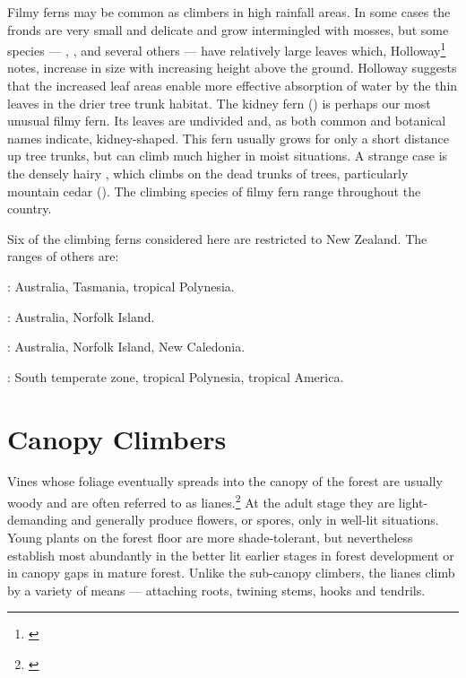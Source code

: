 Filmy ferns may be common as climbers in high rainfall areas.
In some cases the fronds are very small and delicate and grow intermingled with mosses, but some species — , ,  and several others — have relatively large leaves which, Holloway\footnote{\cite{holloway1923studies}} notes, increase in size with increasing height above the ground.
Holloway suggests that the increased leaf areas enable more effective absorption of water by the thin leaves in the drier tree trunk habitat.
The kidney fern () is perhaps our most unusual filmy fern.
Its leaves are undivided and, as both common and botanical names indicate, kidney-shaped.
This fern usually grows for only a short distance up tree trunks, but can climb much higher in moist situations.
A strange case is the densely hairy , which climbs on the dead trunks of trees, particularly mountain cedar ().
The climbing species of filmy fern range throughout the country.

Six of the climbing ferns considered here are restricted to New Zealand.
The ranges of others are:

: Australia, Tasmania, tropical Polynesia.

: Australia, Norfolk Island.

: Australia, Norfolk Island, New Caledonia.

: South temperate zone, tropical Polynesia, tropical America.

\section{Canopy Climbers}

Vines whose foliage eventually spreads into the canopy of the forest are usually woody and are often referred to as lianes.\footnote{\cite{bird1916observations}}
At the adult stage they are light-demanding and generally produce flowers, or spores, only in well-lit situations.
Young plants on the forest floor are more shade-tolerant, but nevertheless establish most abundantly in the better lit earlier stages in forest development or in canopy gaps in mature forest.
Unlike the sub-canopy climbers, the lianes climb by a variety of means — attaching roots, twining stems, hooks and tendrils.

